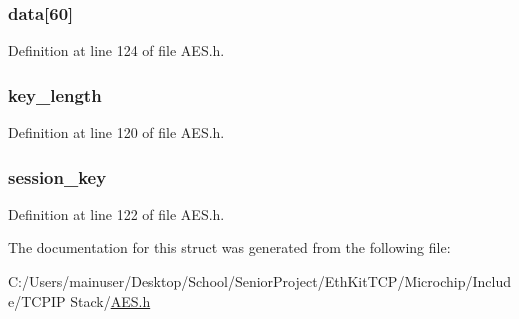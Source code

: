\subsubsection[{data}]{ data\mbox{[}60\mbox{]}}\label{struct_a_e_s___r_o_u_n_d___k_e_y_s__256___b_i_t_ae08c670d6f02eae00b54f6fe83a58419}


Definition at line 124 of file A\+E\+S.\+h.

\hypertarget{struct_a_e_s___r_o_u_n_d___k_e_y_s__256___b_i_t_aa42d871fcd1183159392e19781181b56}{}
\subsubsection[{key\+\_\+length}]{ key\+\_\+length}\label{struct_a_e_s___r_o_u_n_d___k_e_y_s__256___b_i_t_aa42d871fcd1183159392e19781181b56}


Definition at line 120 of file A\+E\+S.\+h.

\hypertarget{struct_a_e_s___r_o_u_n_d___k_e_y_s__256___b_i_t_a8188e88d5ecaef25564a4afaaf888573}{}
\subsubsection[{session\+\_\+key}]{ session\+\_\+key}\label{struct_a_e_s___r_o_u_n_d___k_e_y_s__256___b_i_t_a8188e88d5ecaef25564a4afaaf888573}


Definition at line 122 of file A\+E\+S.\+h.



The documentation for this struct was generated from the following file\+:\begin{DoxyCompactItemize}
\item 
C\+:/\+Users/mainuser/\+Desktop/\+School/\+Senior\+Project/\+Eth\+Kit\+T\+C\+P/\+Microchip/\+Include/\+T\+C\+P\+I\+P Stack/\hyperlink{_a_e_s_8h}{A\+E\+S.\+h}\end{DoxyCompactItemize}
